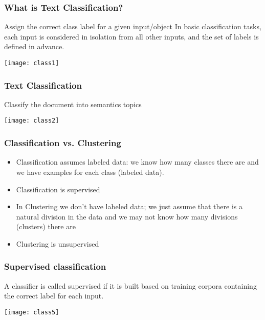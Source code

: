 \begin{frame}[fragile]
  \frametitle{What is Text Classification?}
Assign the correct class label for a given input/object In basic classification tasks, each input is considered in isolation from all other inputs, and the set of labels is defined in advance. 
\begin{center}
\texttt{[image: class1]}
\end{center}
\end{frame}

\begin{frame}[fragile]
  \frametitle{Text Classification}
Classify the document into semantics topics
\begin{center}
\texttt{[image: class2]}
\end{center}
\end{frame}

\begin{frame}[fragile]
  \frametitle{Classification vs. Clustering}
\begin{itemize}
\item Classification assumes labeled data: we know how many classes there are and we have examples for each class (labeled data). 
\item Classification is supervised
\item In Clustering we don't have labeled data; we just assume that there is a natural division in the data and we may not know how many divisions (clusters) there are
\item Clustering is unsupervised
\end{itemize}
\end{frame}

\begin{frame}[fragile]
  \frametitle{Supervised classification}
A classifier is called supervised if it is built based on training corpora containing the correct label for each input. 

\begin{center}
\texttt{[image: class5]}
\end{center}
\end{frame}

